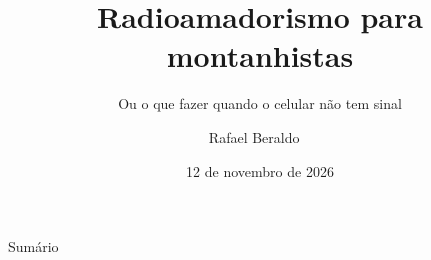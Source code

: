 \documentclass[aspectratio=169, 11pt]{beamer}
\title[Radioamadorismo para montanhistas]{Radioamadorismo para montanhistas}
\subtitle{Ou o que fazer quando o celular não tem sinal}
\author{Rafael Beraldo \textperiodcentered\ \indicativo{PU1JAZ}}
\institute[\CERJ]{Centro Excursionista Rio de Janeiro (\CERJ)}
\date{12 de novembro de 2026}
\begin{document}
\cerjtitleframe

\begin{frame}{Sumário}
  \tableofcontents
\end{frame}











\end{document}
